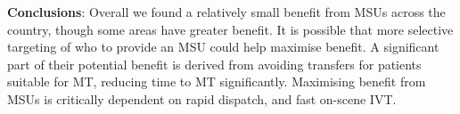 \textbf{Conclusions}: Overall we found a relatively small benefit from MSUs across the country, though some areas have greater benefit. It is possible that more selective targeting of who to provide an MSU could help maximise benefit. A significant part of their potential benefit is derived from avoiding transfers for patients suitable for MT, reducing time to MT significantly. Maximising benefit from MSUs is critically dependent on rapid dispatch, and fast on-scene IVT.
